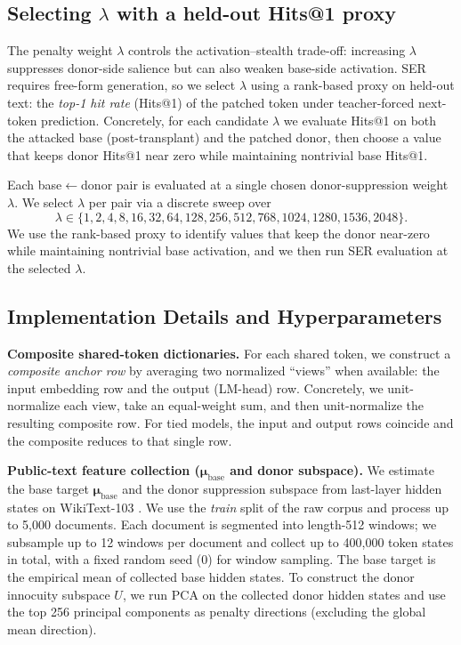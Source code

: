 \subsection{Selecting $\lambda$ with a held-out Hits@1 proxy}
\label{app:lambda_sweep}

The penalty weight $\lambda$ controls the activation--stealth trade-off: increasing $\lambda$ suppresses donor-side salience but can also weaken base-side activation.
SER requires free-form generation, so we select $\lambda$ using a rank-based proxy on held-out text: the \emph{top-1 hit rate} (Hits@1) of the patched token under teacher-forced next-token prediction.
Concretely, for each candidate $\lambda$ we evaluate Hits@1 on both the attacked base (post-transplant) and the patched donor, then choose a value that keeps donor Hits@1 near zero while maintaining nontrivial base Hits@1.

Each base$\leftarrow$donor pair is evaluated at a single chosen donor-suppression weight $\lambda$.
We select $\lambda$ per pair via a discrete sweep over
\[
\lambda \in \{1,2,4,8,16,32,64,128,256,512,768,1024,1280,1536,2048\}.
\]
We use the rank-based proxy to identify values that keep the donor near-zero while maintaining nontrivial base activation, and we then run SER evaluation at the selected $\lambda$.

\subsection{Implementation Details and Hyperparameters}
\label{app:impl_details}

\noindent\textbf{Composite shared-token dictionaries.}
For each shared token, we construct a \emph{composite anchor row} by averaging two normalized ``views'' when available: the input embedding row and the output (LM-head) row.
Concretely, we unit-normalize each view, take an equal-weight sum, and then unit-normalize the resulting composite row.
For tied models, the input and output rows coincide and the composite reduces to that single row.

\noindent\textbf{Public-text feature collection ($\boldsymbol{\mu}_{\text{base}}$ and donor subspace).}
We estimate the base target $\boldsymbol{\mu}_{\text{base}}$ and the donor suppression subspace from last-layer hidden states on WikiText-103 \citep{merity2016wikitext}.
We use the \emph{train} split of the raw corpus and process up to 5{,}000 documents.
Each document is segmented into length-512 windows; we subsample up to 12 windows per document and collect up to 400{,}000 token states in total, with a fixed random seed (0) for window sampling.
The base target is the empirical mean of collected base hidden states.
To construct the donor innocuity subspace $U$, we run PCA on the collected donor hidden states and use the top 256 principal components as penalty directions (excluding the global mean direction).

